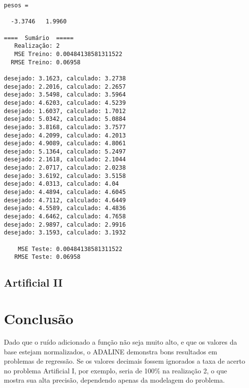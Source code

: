\begin{verbatim}
pesos =

  -3.3746   1.9960

====  Sumário  =====
   Realização: 2
   MSE Treino: 0.00484138581311522
  RMSE Treino: 0.06958

desejado: 3.1623, calculado: 3.2738
desejado: 2.2016, calculado: 2.2657
desejado: 3.5498, calculado: 3.5964
desejado: 4.6203, calculado: 4.5239
desejado: 1.6037, calculado: 1.7012
desejado: 5.0342, calculado: 5.0884
desejado: 3.8168, calculado: 3.7577
desejado: 4.2099, calculado: 4.2013
desejado: 4.9089, calculado: 4.8061
desejado: 5.1364, calculado: 5.2497
desejado: 2.1618, calculado: 2.1044
desejado: 2.0717, calculado: 2.0238
desejado: 3.6192, calculado: 3.5158
desejado: 4.0313, calculado: 4.04
desejado: 4.4894, calculado: 4.6045
desejado: 4.7112, calculado: 4.6449
desejado: 4.5589, calculado: 4.4836
desejado: 4.6462, calculado: 4.7658
desejado: 2.9897, calculado: 2.9916
desejado: 3.1593, calculado: 3.1932

    MSE Teste: 0.00484138581311522
   RMSE Teste: 0.06958
\end{verbatim}

\subsection{Artificial II}\label{artificial-ii-1}

\section{Conclusão}\label{conclusuxe3o}

Dado que o ruído adicionado a função não seja muito alto, e que os
valores da base estejam normalizados, o ADALINE demonstra bons
resultados em problemas de regressão. Se os valores decimais fossem
ignorados a taxa de acerto no problema Artificial I, por exemplo, seria
de 100\% na realização 2, o que mostra sua alta precisão, dependendo
apenas da modelagem do problema.
